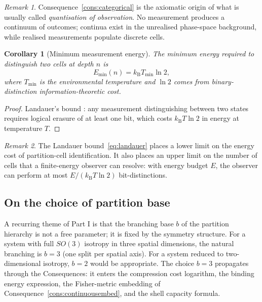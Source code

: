 \documentclass[11pt,twocolumn,a4paper]{article}
\theoremstyle{axiomstyle}
\theoremstyle{conseqstyle}
\newtheorem{corollary}{Corollary}
\theoremstyle{definition}
\theoremstyle{remark}
\newtheorem*{remark}{Remark}
\newcommand{\kB}{k_{\mathrm{B}}}
\begin{document}
\begin{remark}
Consequence~\ref{cons:categorical} is the axiomatic origin of what is usually called \emph{quantisation of observation}. No measurement produces a continuum of outcomes; continua exist in the unrealised phase-space background, while realised measurements populate discrete cells.
\end{remark}

\begin{corollary}[Minimum measurement energy]
\label{cor:measurementenergy}
The minimum energy required to distinguish two cells at depth $n$ is
\begin{equation}
E_{\min}(n)=\kB T_{\min}\ln 2,
\label{eq:landauer}
\end{equation}
where $T_{\min}$ is the environmental temperature and $\ln 2$ comes from binary-distinction information-theoretic cost.
\end{corollary}

\begin{proof}
Landauer's bound \citep{landauer1961}: any measurement distinguishing between two states requires logical erasure of at least one bit, which costs $\kB T\ln 2$ in energy at temperature $T$.
\end{proof}

\begin{remark}
The Landauer bound~\eqref{eq:landauer} places a lower limit on the energy cost of partition-cell identification. It also places an upper limit on the number of cells that a finite-energy observer can resolve: with energy budget $E$, the observer can perform at most $E/(\kB T\ln 2)$ bit-distinctions.
\end{remark}

\subsection{On the choice of partition base}

A recurring theme of Part I is that the branching base $b$ of the partition hierarchy is not a free parameter; it is fixed by the symmetry structure. For a system with full $SO(3)$ isotropy in three spatial dimensions, the natural branching is $b=3$ (one split per spatial axis). For a system reduced to two-dimensional isotropy, $b=2$ would be appropriate. The choice $b=3$ propagates through the Consequences: it enters the compression cost logarithm, the binding energy expression, the Fisher-metric embedding of Consequence~\ref{cons:continuousembed}, and the shell capacity formula.
\end{document}
